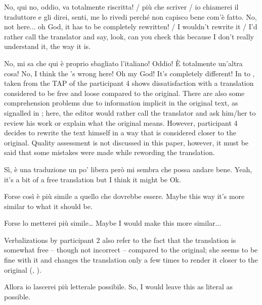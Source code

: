 \documentclass[output=paper]{LSP/langsci}
\begin{document}
\ea \label{troqe-marchan:ex:24} 
\glt No, qui no, oddio, va totalmente riscritta! / più che scriver / io chiamerei il traduttore e gli direi, senti, me lo rivedi perché non capisco bene com'è fatto.
\glt No, not here... oh God, it has to be completely rewritten! / I wouldn't rewrite it / I'd rather call the translator and say, look, can you check this because I don't really understand it, the way it is.
\z 

\ea \label{troqe-marchan:ex:25} 
\glt No, mi sa che qui è proprio sbagliato l'italiano! Oddio! È totalmente un'altra cosa!
\glt No, I think the 's wrong here! Oh my God! It's completely different!
\z
%
In  to , taken from the TAP of the participant 4 shows dissatisfaction with a translation considered to be free and loose compared to the original. There are also some comprehension problems due to information implicit in the original text, as signalled in ; here, the editor would rather call the translator and ask him/her to review his work or explain what the original means. However, participant 4 decides to rewrite the text himself in a way that is considered closer to the original. Quality assessment is not discussed in this paper, however, it must be said that some mistakes were made while rewording the translation. 

\ea \label{troqe-marchan:ex:26} 
\glt Sì, è una traduzione un po' libera però mi sembra che possa andare bene.
\glt Yeah, it's a bit of a free translation but I think it might be Ok.
\z 

\ea \label{troqe-marchan:ex:27} 
\glt Forse così è più simile a quello che dovrebbe essere.
\glt Maybe this way it's more similar to what it should be.
\z 

\ea \label{troqe-marchan:ex:28} 
\glt Forse lo metterei più simile\ldots  
\glt Maybe I would make this more similar... 
\z 

Verbalizations by participant 2 also refer to the fact that the translation is somewhat free -- though not incorrect -- compared to the original; she seems to be fine with it and changes the translation only a few times to render it closer to the original (, ).

\ea \label{troqe-marchan:ex:29} 
\glt Allora io lascerei più letterale possibile. 
\glt So, I would leave this as literal as possible.
\z 
\end{document}
